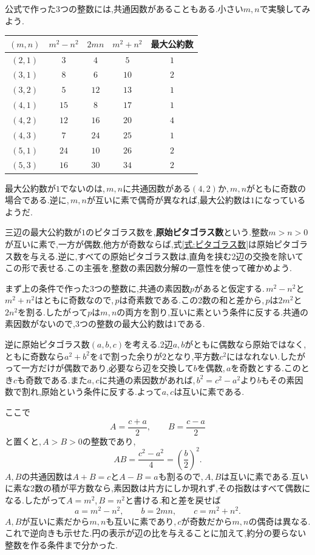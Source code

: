公式で作った3つの整数には,共通因数があることもある.小さい$m,n$で実験してみよう.
\begin{center}
\begin{tabular}{ccccc}
\toprule
$(m,n)$ & $m^2-n^2$ & $2mn$ & $m^2+n^2$ & 最大公約数\\
\midrule
$(2,1)$ & $3$ & $4$ & $5$ & $1$\\
$(3,1)$ & $8$ & $6$ & $10$ & $2$\\
$(3,2)$ & $5$ & $12$ & $13$ & $1$\\
$(4,1)$ & $15$ & $8$ & $17$ & $1$\\
$(4,2)$ & $12$ & $16$ & $20$ & $4$\\
$(4,3)$ & $7$ & $24$ & $25$ & $1$\\
$(5,1)$ & $24$ & $10$ & $26$ & $2$\\
$(5,3)$ & $16$ & $30$ & $34$ & $2$\\
\bottomrule
\end{tabular}
\end{center}
最大公約数が$1$でないのは,\,$m,n$に共通因数がある$(4,2)$か,\,$m,n$がともに奇数の場合である.逆に,\,$m,n$が互いに素で偶奇が異なれば,最大公約数は$1$になっているようだ.

三辺の最大公約数が$1$のピタゴラス数を,\textbf{原始ピタゴラス数}という.整数$m>n>0$が互いに素で,一方が偶数,他方が奇数ならば,式\eqref{式:ピタゴラス数}は原始ピタゴラス数を与える.逆に,すべての原始ピタゴラス数は,直角を挟む2辺の交換を除いてこの形で表せる.この主張を,整数の素因数分解の一意性を使って確かめよう.

まず上の条件で作った3つの整数に,共通の素因数$p$があると仮定する.\,$m^2-n^2$と$m^2+n^2$はともに奇数なので,\,$p$は奇素数である.この2数の和と差から,\,$p$は$2m^2$と$2n^2$を割る.したがって$p$は$m,n$の両方を割り,互いに素という条件に反する.共通の素因数がないので,3つの整数の最大公約数は$1$である.

逆に原始ピタゴラス数$(a,b,c)$を考える.2辺$a,b$がともに偶数なら原始ではなく,ともに奇数なら$a^2+b^2$を$4$で割った余りが$2$となり,平方数$c^2$にはなれない.したがって一方だけが偶数であり,必要なら辺を交換して$b$を偶数,\,$a$を奇数とする.このとき$c$も奇数である.また$a,c$に共通の素因数があれば,\,$b^2=c^2-a^2$より$b$もその素因数で割れ,原始という条件に反する.よって$a,c$は互いに素である.

ここで
\[
A=\frac{c+a}{2},\qquad B=\frac{c-a}{2}
\]
と置くと,\,$A>B>0$の整数であり,
\[
AB=\frac{c^2-a^2}{4}=\left(\frac b2\right)^2.
\]
$A,B$の共通因数は$A+B=c$と$A-B=a$も割るので,\,$A,B$は互いに素である.互いに素な2数の積が平方数なら,素因数は片方にしか現れず,その指数はすべて偶数になる.したがって$A=m^2$,\,$B=n^2$と書ける.和と差を戻せば
\[
a=m^2-n^2,\qquad b=2mn,\qquad c=m^2+n^2.
\]
$A,B$が互いに素だから$m,n$も互いに素であり,\,$c$が奇数だから$m,n$の偶奇は異なる.これで逆向きも示せた.円の表示が辺の比を与えることに加えて,約分の要らない整数を作る条件まで分かった.
